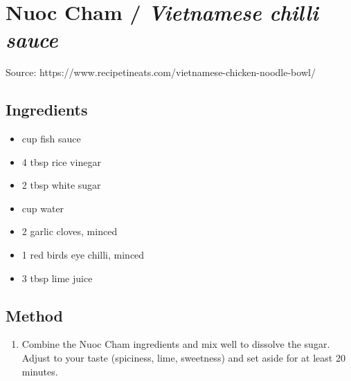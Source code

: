 \clearpage
\section{Nuoc Cham / \emph{Vietnamese chilli sauce}}


Source: https://www.recipetineats.com/vietnamese-chicken-noodle-bowl/

\subsection{Ingredients}

\begin{itemize}
    \item {} cup fish sauce
    \item 4 tbsp rice vinegar
    \item 2 tbsp white sugar
    \item {} cup water
    \item 2 garlic cloves, minced
    \item 1 red birds eye chilli, minced
    \item 3 tbsp lime juice
\end{itemize}

\subsection{Method}

\begin{enumerate}
    \item Combine the Nuoc Cham ingredients and mix well to dissolve the sugar. Adjust to your taste (spiciness, lime, sweetness) and set aside for at least 20 minutes.
\end{enumerate}
